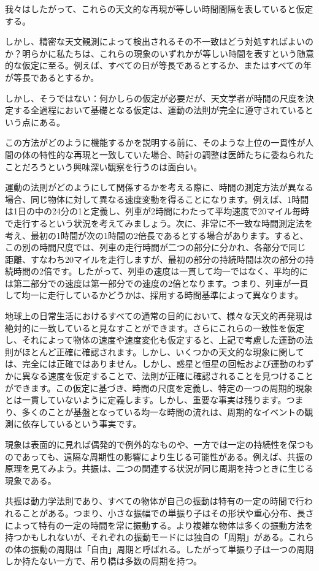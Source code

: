 \documentclass[a4paper,11pt,openany]{ltjsbook}
\begin{document}
我々はしたがって、これらの天文的な再現が等しい時間間隔を表していると仮定する。

しかし、精密な天文観測によって検出されるその不一致はどう対処すればよいのか？明らかに私たちは、これらの現象のいずれかが等しい時間を表すという随意的な仮定に至る。例えば、すべての日が等長であるとするか、またはすべての年が等長であるとするか。

しかし、そうではない：何かしらの仮定が必要だが、天文学者が時間の尺度を決定する全過程において基礎となる仮定は、運動の法則が完全に遵守されているという点にある。

この方法がどのように機能するかを説明する前に、そのような上位の一貫性が人間の体の特性的な再現と一致していた場合、時計の調整は医師たちに委ねられたことだろうという興味深い観察を行うのは面白い。

運動の法則がどのようにして関係するかを考える際に、時間の測定方法が異なる場合、同じ物体に対して異なる速度変動を得ることになります。例えば、1時間は1日の中の24分の1と定義し、列車が2時間にわたって平均速度で20マイル毎時で走行するという状況を考えてみましょう。次に、非常に不一致な時間測定法を考え、最初の1時間が次の1時間の2倍長であるとする場合があります。すると、この別の時間尺度では、列車の走行時間が二つの部分に分かれ、各部分で同じ距離、すなわち20マイルを走行しますが、最初の部分の持続時間は次の部分の持続時間の2倍です。したがって、列車の速度は一貫して均一ではなく、平均的には第二部分での速度は第一部分での速度の2倍となります。つまり、列車が一貫して均一に走行しているかどうかは、採用する時間基準によって異なります。

地球上の日常生活におけるすべての通常の目的において、様々な天文的再発現は絶対的に一致していると見なすことができます。さらにこれらの一致性を仮定し、それによって物体の速度や速度変化も仮定すると、上記で考慮した運動の法則がほとんど正確に確認されます。しかし、いくつかの天文的な現象に関しては、完全には正確ではありません。しかし、惑星と恒星の回転および運動のわずかに異なる速度を仮定することで、法則が正確に確認されることを見つけることができます。この仮定に基づき、時間の尺度を定義し、特定の一つの周期的現象とは一貫していないように定義します。しかし、重要な事実は残ります。つまり、多くのことが基盤となっている均一な時間の流れは、周期的なイベントの観測に依存しているという事実です。

現象は表面的に見れば偶発的で例外的なものや、一方では一定の持続性を保つものであっても、遠隔な周期性の影響により生じる可能性がある。例えば、共振の原理を見てみよう。共振は、二つの関連する状況が同じ周期を持つときに生じる現象である。

共振は動力学法則であり、すべての物体が自己の振動は特有の一定の時間で行われることがある。つまり、小さな振幅での単振り子はその形状や重心分布、長さによって特有の一定の時間を常に振動する。より複雑な物体は多くの振動方法を持つかもしれないが、それぞれの振動モードには独自の「周期」がある。これらの体の振動の周期は「自由」周期と呼ばれる。したがって単振り子は一つの周期しか持たない一方で、吊り橋は多数の周期を持つ。
\end{document}
